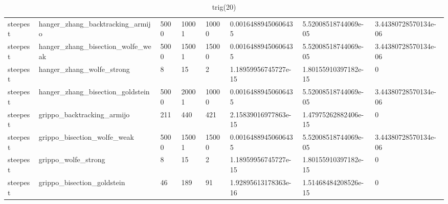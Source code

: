 \documentclass[a4paper,11pt]{article}
\numberwithin{equation}{section} %
\begin{document}
\begin{table}[h!]
{\begin{tabular}{|l|l|l|l|l|l|l|l|}
        steepest & hanger\_zhang\_backtracking\_armijo & 5000 & 10001 & 10000 & 0.00164889450606435 & 5.52008518744069e-05 & 3.44380728570134e-06 \\
        steepest & hanger\_zhang\_bisection\_wolfe\_weak & 5000 & 15001 & 15000 & 0.00164889450606435 & 5.52008518744069e-05 & 3.44380728570134e-06 \\
        steepest & hanger\_zhang\_wolfe\_strong & 8 & 15 & 2 & 1.18959956745727e-15 & 1.80155910397182e-15 & 0 \\
        steepest & hanger\_zhang\_bisection\_goldstein & 5000 & 20001 & 10000 & 0.00164889450606435 & 5.52008518744069e-05 & 3.44380728570134e-06 \\
        steepest & grippo\_backtracking\_armijo & 211 & 440 & 421 & 2.15839016977863e-15 & 1.47975262882406e-15 & 0 \\
        steepest & grippo\_bisection\_wolfe\_weak & 5000 & 15001 & 15000 & 0.00164889450606435 & 5.52008518744069e-05 & 3.44380728570134e-06 \\
        steepest & grippo\_wolfe\_strong & 8 & 15 & 2 & 1.18959956745727e-15 & 1.80155910397182e-15 & 0 \\
        steepest & grippo\_bisection\_goldstein & 46 & 189 & 91 & 1.92895613178363e-16 & 1.51468484208526e-15 & 0 \\
\end{tabular}}
\caption{trig(20)}
\label{table:trig(20)}
\end{table}
\end{document}
